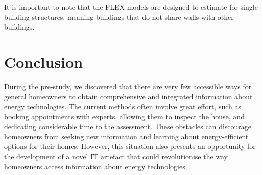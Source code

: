 %
%

It is important to note that the FLEX models are designed to estimate for single building structures, meaning buildings that do not share walls with other buildings. 


\section{Conclusion}

During the pre-study, we discovered that there are very few accessible ways for general homeowners to obtain comprehensive and integrated information about energy technologies. 
The current methods often involve great effort, such as booking appointments with experts, allowing them to inspect the house, and dedicating considerable time to the assessment. 
These obstacles can discourage homeowners from seeking new information and learning about energy-efficient options for their homes. 
However, this situation also presents an opportunity for the development of a novel IT artefact that could revolutionise the way homeowners access information about energy technologies. 


